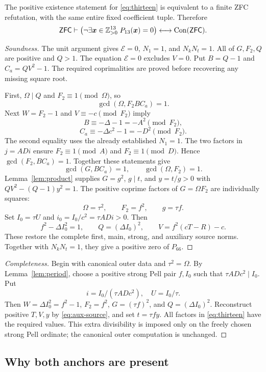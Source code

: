 \begin{theorem}\label{thm:thirteen}
The positive existence statement for \eqref{eq:thirteen} is equivalent to a
finite ZFC refutation, with the same entire fixed coefficient tuple. Therefore
\[
\mathsf{ZFC}\vdash
\bigl(\neg\exists\boldsymbol{x}\in\mathbb Z_{>0}^{13}\;P_{13}(\boldsymbol{x})=0\bigr)
\longleftrightarrow\operatorname{Con}(\mathsf{ZFC}).
\]
\end{theorem}
\begin{proof}[Soundness]
The unit argument gives $\mathcal E=0$, $N_1=1$, and $N_kN_t=1$.
All of $G,F_2,Q$ are positive and $Q>1$.
The equation $\mathcal E=0$ excludes $V=0$.
Put $B=Q-1$ and $C_a=QV^2-1$. The required coprimalities are proved
before recovering any missing square root.

First, $\Omega\mid Q$ and $F_2\equiv1\pmod\Omega$, so
\[
\gcd(\Omega,F_2BC_a)=1.
\]
Next $W=F_2-1$ and $V\equiv-c\pmod{F_2}$ imply
\[
B\equiv-\Delta-1=-A^2\pmod{F_2},
\]
\[
C_a\equiv-\Delta c^2-1=-D^2\pmod{F_2}.
\]
The second equality uses the already established $N_1=1$.
The two factors in $j=ADi$ ensure $F_2\equiv1\pmod A$ and
$F_2\equiv1\pmod D$. Hence $\gcd(F_2,BC_a)=1$.
Together these statements give
\[
\gcd(G,BC_a)=1,\qquad \gcd(\Omega,F_2)=1.
\]
Lemma~\ref{lem:product} supplies $G=g^2$, $g\mid t$, and
$y=t/g>0$ with $QV^2-(Q-1)y^2=1$.
The positive coprime factors of $G=\Omega F_2$ are individually squares:
\[
\Omega=\tau^2,\qquad F_2=f^2,\qquad g=\tau f.
\]
Set $I_0=\tau U$ and $i_0=I_0/c^2=\tau ADi>0$.
Then
\[
f^2-\Delta I_0^2=1,\qquad Q=(\Delta I_0)^2,
\qquad V=f^2(cT-R)-c.
\]
These restore the complete first, main, strong, and auxiliary source norms.
Together with $N_kN_t=1$, they give a positive zero of $P_{66}$.
\end{proof}
\begin{proof}[Completeness]
Begin with canonical outer data and $\tau^2=\Omega$.
By Lemma~\ref{lem:period}, choose a positive strong Pell pair $f,I_0$
such that $\tau ADc^2\mid I_0$. Put
\[
i=I_0/(\tau ADc^2),\quad U=I_0/\tau.
\]
Then $W=\Delta I_0^2=f^2-1$, $F_2=f^2$, $G=(\tau f)^2$,
and $Q=(\Delta I_0)^2$.
Reconstruct positive $T,V,y$ by \eqref{eq:aux-source}, and set
$t=\tau f y$. All factors in \eqref{eq:thirteen} have the required values.
This extra divisibility is imposed only on the freely chosen strong Pell
ordinate; the canonical outer computation is unchanged.
\end{proof}

\subsection{Why both anchors are present}

